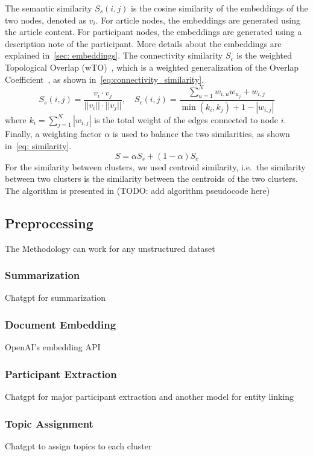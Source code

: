 The semantic similarity $S_s(i, j)$ is the cosine similarity of the embeddings of the two nodes, denoted as $v_i$.
For article nodes, the embeddings are generated using the article content.
For participant nodes, the embeddings are generated using a description note of the participant.
More details about the embeddings are explained in~\autoref{sec: embeddings}.
The connectivity similarity $S_c$ is the weighted Topological Overlap (wTO)~\cite{gysi2018wto},
which is a weighted generalization of the Overlap Coefficient~\cite{vijaymeena2016survey}, as shown in~\autoref{eq:connectivity_similarity}.
\begin{equation}\label{eq:connectivity_similarity}
    S_s(i, j) = \frac{v_i \cdot v_j}{||v_i|| \cdot ||v_j||}, \quad
    S_c(i, j) = \frac{\sum_{u=1}^N{w_{i,u}w_{u_j}} + w_{i,j}}{\min(k_i, k_j) + 1 - |w_{i,j}|}
\end{equation}
where $k_i = \sum_{j=1}^N |w_{i,j}|$ is the total weight of the edges connected to node $i$.
Finally, a weighting factor $\alpha$ is used to balance the two similarities, as shown in~\autoref{eq: similarity}.
\begin{equation}\label{eq: similarity}
    S = \alpha S_s + (1-\alpha) S_c
\end{equation}
For the similarity between clusters, we used centroid similarity, i.e.\ the similarity between two clusters is the similarity between the centroids of the two clusters.
The algorithm is presented in (TODO: add algorithm pseudocode here)



\subsection{Preprocessing}
The Methodology can work for any unstructured dataset
\subsubsection{Summarization}
Chatgpt for summarization
\subsubsection{Document Embedding}\label{sec: embeddings}
OpenAI's embedding API
\subsubsection{Participant Extraction}\label{sec: participant_extraction}
Chatgpt for major participant extraction and another model for entity linking

\subsubsection{Topic Assignment}\label{sec: tag_assignment}
Chatgpt to assign topics to each cluster

